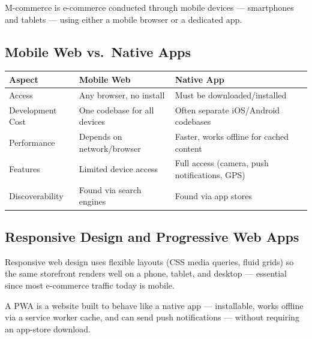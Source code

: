 \documentclass[11pt,a4paper]{article}
\begin{document}
\begin{definitionbox}
M-commerce is e-commerce conducted through mobile devices --- smartphones and tablets --- using either a mobile browser or a dedicated app.
\end{definitionbox}

\subsection{Mobile Web vs.\ Native Apps}
\begin{center}
\begin{tabular}{@{}p{2.6cm}p{5.2cm}p{5.2cm}@{}}
\toprule
\rowcolor{primary!15}
\textbf{Aspect} & \textbf{Mobile Web} & \textbf{Native App} \\
\midrule
Access & Any browser, no install & Must be downloaded/installed \\
Development Cost & One codebase for all devices & Often separate iOS/Android codebases \\
Performance & Depends on network/browser & Faster, works offline for cached content \\
Features & Limited device access & Full access (camera, push notifications, GPS) \\
Discoverability & Found via search engines & Found via app stores \\
\bottomrule
\end{tabular}
\end{center}

\subsection{Responsive Design and Progressive Web Apps}
\begin{conceptbox}
Responsive web design uses flexible layouts (CSS media queries, fluid grids) so the same storefront renders well on a phone, tablet, and desktop --- essential since most e-commerce traffic today is mobile.
\end{conceptbox}
\begin{definitionbox}
A PWA is a website built to behave like a native app --- installable, works offline via a service worker cache, and can send push notifications --- without requiring an app-store download.
\end{definitionbox}

\end{document}
